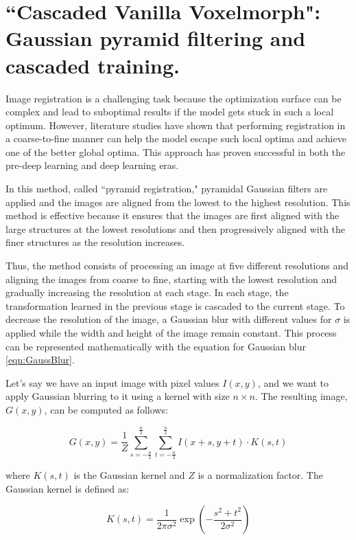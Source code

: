 \documentclass{book}
\begin{document}
	\section{``Cascaded Vanilla Voxelmorph": Gaussian pyramid filtering and cascaded training.}
	Image registration is a challenging task because the optimization surface can be complex and lead to suboptimal results if the model gets stuck in such a local optimum. However, literature studies have shown that performing registration in a coarse-to-fine manner can help the model escape such local optima and achieve one of the better global optima. This approach has proven successful in both the pre-deep learning and deep learning eras.
	
	In this method, called ``pyramid registration," pyramidal Gaussian filters are applied and the images are aligned from the lowest to the highest resolution. This method is effective because it ensures that the images are first aligned with the large structures at the lowest resolutions and then progressively aligned with the finer structures as the resolution increases.
	
	Thus, the method consists of processing an image at five different resolutions and aligning the images from coarse to fine, starting with the lowest resolution and gradually increasing the resolution at each stage. In each stage, the transformation learned in the previous stage is cascaded to the current stage. To decrease the resolution of the image, a Gaussian blur with different values for $\sigma$ is applied while the width and height of the image remain constant. This process can be represented mathematically with the equation for Gaussian blur \ref{eqn:GaussBlur}.
	
	Let's say we have an input image with pixel values $I(x, y)$, and we want to apply Gaussian blurring to it using a kernel with size $n \times n$. The resulting image, $G(x, y)$, can be computed as follows:
	
	\begin{equation}\label{eqn:GaussBlur}
		G(x, y) = \frac{1}{Z} \sum_{s=-\frac{n}{2}}^{\frac{n}{2}}\sum_{t=-\frac{n}{2}}^{\frac{n}{2}}I(x+s, y+t) \cdot K(s, t)
	\end{equation}
	
	where $K(s, t)$ is the Gaussian kernel and $Z$ is a normalization factor. The Gaussian kernel is defined as:
	
	\begin{equation}
		K(s, t) = \frac{1}{2\pi \sigma^2} \exp\left(-\frac{s^2+t^2}{2\sigma^2}\right)
	\end{equation}
	
\end{document}
